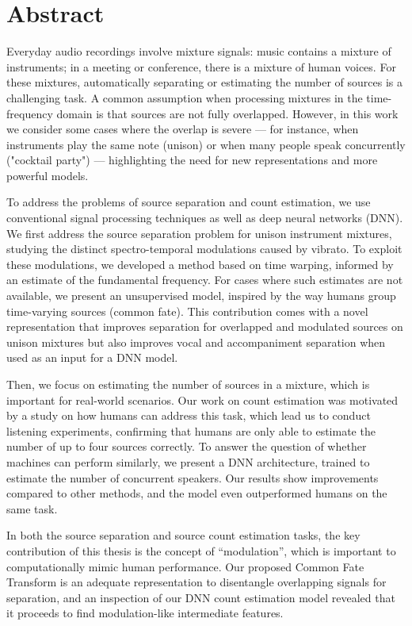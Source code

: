 \begingroup
\let\clearpage\relax
\let\cleardoublepage\relax
\let\cleardoublepage\relax

\chapter*{Abstract}
Everyday audio recordings involve mixture signals: music contains a mixture of instruments; in a meeting or conference, there is a mixture of human voices. 
For these mixtures, automatically separating or estimating the number of sources is a challenging task.
A common assumption when processing mixtures in the time-frequency domain is that sources are not fully overlapped.
However, in this work we consider some cases where the overlap is severe --- for instance, when instruments play the same note (unison) or when many people speak concurrently ("cocktail party") --- highlighting the need for new representations and more powerful models.
\par
To address the problems of source separation and count estimation, we use conventional signal processing techniques as well as deep neural networks (DNN).
We first address the source separation problem for unison instrument mixtures, studying the distinct spectro-temporal modulations caused by vibrato.
To exploit these modulations, we developed a method based on time warping, informed by an estimate of the fundamental frequency.
For cases where such estimates are not available, we present an unsupervised model, inspired by the way humans group time-varying sources (common fate).
This contribution comes with a novel representation that improves separation for overlapped and modulated sources on unison mixtures but also improves vocal and accompaniment separation when used as an input for a DNN model.
\par
Then, we focus on estimating the number of sources in a mixture, which is important for real-world scenarios.
Our work on count estimation was motivated by a study on how humans can address this task, which lead us to conduct listening experiments, confirming that humans are only able to estimate the number of up to four sources correctly.
To answer the question of whether machines can perform similarly, we present a DNN architecture, trained to estimate the number of concurrent speakers.
Our results show improvements compared to other methods, and the model even outperformed humans on the same task.
\par
In both the source separation and source count estimation tasks, the key contribution of this thesis is the concept of ``modulation'', which is important to computationally mimic human performance. 
Our proposed Common Fate Transform is an adequate representation to disentangle overlapping signals for separation, and an inspection of our DNN count estimation model revealed that it proceeds to find modulation-like intermediate features.
\vfill


